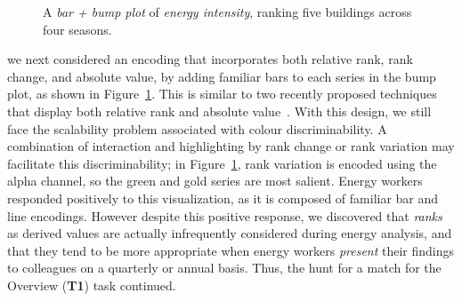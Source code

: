\documentclass[journal]{vgtc}                %
\newcommand{\bstart}[1]{\vspace{1mm} \noindent{\textbf{#1:}}}
\begin{document}
\begin{figure}[ht]
    \vspace{-0.3cm}
	\centering
	\vspace{-0.15cm}
	\caption{A \textsl{bar + bump plot} of \textsl{energy intensity}, ranking five buildings across four seasons.}
	\label{fig:sandbox-barbump}
	\vspace{-0.3cm}
\end{figure}

\bstart{Bump + bar plots} we next considered an encoding that incorporates both relative rank, rank change, and absolute value, by adding familiar bars to each series in the bump plot, as shown in Figure~\ref{fig:sandbox-barbump}. 
This is similar to two recently proposed techniques that display both relative rank and absolute value~\cite{Gratzl2013,Hur2013}. 
With this design, we still face the scalability problem associated with colour discriminability.
A combination of interaction and highlighting by rank change or rank variation may facilitate this discriminability; in Figure~\ref{fig:sandbox-barbump}, rank variation is encoded using the alpha channel, so the green and gold series are most salient.
Energy workers responded positively to this visualization, as it is composed of familiar bar and line encodings. 
However despite this positive response, we discovered that {\it ranks} as derived values are actually infrequently considered during energy analysis, and that they tend to be more appropriate when energy workers {\it present} their findings to colleagues on a quarterly or annual basis.
Thus, the hunt for a match for the Overview ({\bf T1}) task continued.

\end{document}

